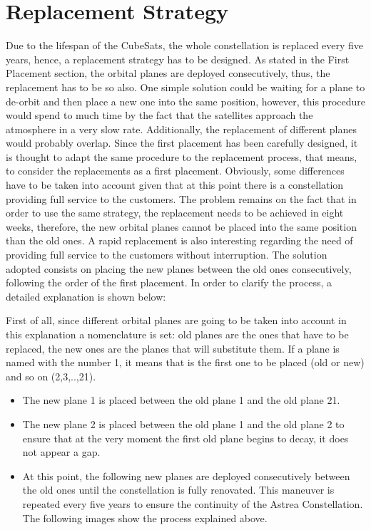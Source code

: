 \section{Replacement Strategy}
Due to the lifespan of the CubeSats, the whole constellation is replaced every five years, hence, a replacement strategy has to be designed. As stated in the First Placement section, the orbital planes are deployed consecutively, thus, the replacement has to be so also. One simple solution could be waiting for a plane to de-orbit and then place a new one into the same position, however, this procedure would spend to much time by the fact that the satellites approach the atmosphere in a very slow rate. Additionally, the replacement of different planes would probably overlap. Since the first placement has been carefully designed, it is thought to adapt the same procedure to the replacement process, that means, to consider the replacements as a first placement. Obviously, some differences have to be taken into account given that at this point there is a constellation providing full service to the customers. The problem remains on the fact that in order to use the same strategy, the replacement needs to be achieved in eight weeks, therefore, the new orbital planes cannot be placed into the same position than the old ones. A rapid replacement is also interesting regarding the need of providing full service to the customers without interruption. The solution adopted consists on placing the new planes between the old ones consecutively, following the order of the first placement. In order to clarify the process, a detailed explanation is shown below:

First of all, since different orbital planes are going to be taken into account in this explanation a nomenclature is set: old planes are the ones that have to be replaced, the new ones are the planes that will substitute them. If a plane is named with the number 1, it means that is the first one to be placed (old or new) and so on (2,3,..,21).
 
\begin{itemize}
\item The new plane 1 is placed between the old plane 1 and the old plane 21.
\item The new plane 2 is placed between the old plane 1 and the old plane 2 to ensure that at the very moment the first old plane begins to decay, it does not appear a gap.
\item At this point, the following new planes are deployed consecutively between the old ones until the constellation is fully renovated. This maneuver is repeated every five years to ensure the continuity of the Astrea Constellation. 
The following images show the process explained above.
\end{itemize}

